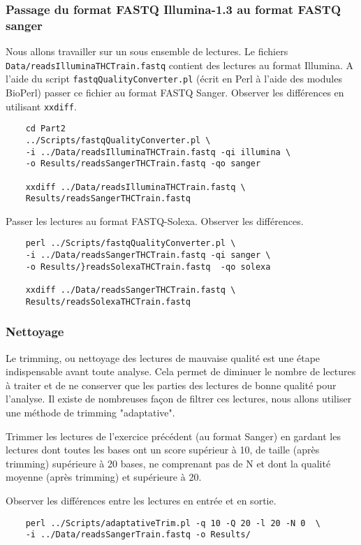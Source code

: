 \documentclass[a4paper,12pt]{article}
\begin{document}
\subsubsection{Passage du format FASTQ Illumina-1.3 au format FASTQ sanger}
Nous allons travailler sur un sous ensemble de lectures. Le fichiers \verb=Data/readsIlluminaTHCTrain.fastq= contient des lectures au format Illumina. A l'aide du script \verb=fastqQualityConverter.pl= (écrit en Perl à l'aide des modules BioPerl) passer ce fichier au format FASTQ Sanger. Observer les différences
en utilisant \verb=xxdiff=.
\begin{lstlisting}
	cd Part2
	../Scripts/fastqQualityConverter.pl \
	-i ../Data/readsIlluminaTHCTrain.fastq -qi illumina \
	-o Results/readsSangerTHCTrain.fastq -qo sanger
	
	xxdiff ../Data/readsIlluminaTHCTrain.fastq \
	Results/readsSangerTHCTrain.fastq
\end{lstlisting}


Passer les lectures au format FASTQ-Solexa. Observer les différences.

\begin{lstlisting}
	perl ../Scripts/fastqQualityConverter.pl \
	-i ../Data/readsSangerTHCTrain.fastq -qi sanger \
	-o Results/}readsSolexaTHCTrain.fastq  -qo solexa
	
	xxdiff ../Data/readsSangerTHCTrain.fastq \
	Results/readsSolexaTHCTrain.fastq
	\end{lstlisting}
	
	
\subsubsection{Nettoyage}
Le trimming, ou nettoyage des lectures de mauvaise qualité est une étape indispensable avant toute analyse. Cela permet de diminuer le nombre de lectures à traiter et de ne conserver que les parties des lectures de bonne qualité pour l'analyse. Il existe de nombreuses façon de filtrer ces lectures, nous allons utiliser une méthode de  trimming "adaptative".

Trimmer les lectures de l'exercice précédent (au format Sanger) en gardant les lectures dont toutes les bases ont  un score supérieur à 10, de taille (après trimming) supérieure à 20 bases, ne comprenant pas de N et dont la qualité moyenne (après trimming) et supérieure à 20. 

Observer les différences entre les lectures en entrée et en sortie.

\begin{lstlisting}	
	perl ../Scripts/adaptativeTrim.pl -q 10 -Q 20 -l 20 -N 0  \
	-i ../Data/readsSangerTrain.fastq -o Results/
\end{lstlisting}
\end{document}
